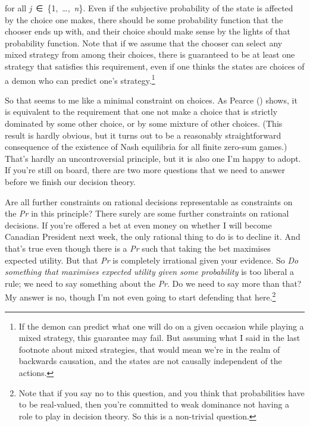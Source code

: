 \documentclass[
  11pt,
  letterpaper,
  DIV=11,
  numbers=noendperiod,
  twoside]{scrartcl}
\begin{document}
for all \emph{j}~∈~\{1,~\ldots,~\emph{n}\}. Even if the subjective
probability of the state is affected by the choice one makes, there
should be some probability function that the chooser ends up with, and
their choice should make sense by the lights of that probability
function. Note that if we assume that the chooser can select any mixed
strategy from among their choices, there is guaranteed to be at least
one strategy that satisfies this requirement, even if one thinks the
states are choices of a demon who can predict one's strategy.\footnote{If
  the demon can predict what one will do on a given occasion while
  playing a mixed strategy, this guarantee may fail. But assuming what I
  said in the last footnote about mixed strategies, that would mean
  we're in the realm of backwards causation, and the states are not
  causally independent of the actions.}

So that seems to me like a minimal constraint on choices. As Pearce
() shows, it is equivalent to the
requirement that one not make a choice that is strictly dominated by
some other choice, or by some mixture of other choices. (This result is
hardly obvious, but it turns out to be a reasonably straightforward
consequence of the existence of Nash equilibria for all finite zero-sum
games.) That's hardly an uncontroversial principle, but it is also one
I'm happy to adopt. If you're still on board, there are two more
questions that we need to answer before we finish our decision theory.

Are all further constraints on rational decisions representable as
constraints on the \emph{Pr} in this principle? There surely are some
further constraints on rational decisions. If you're offered a bet at
even money on whether I will become Canadian President next week, the
only rational thing to do is to decline it. And that's true even though
there is a \emph{Pr} such that taking the bet maximises expected
utility. But that \emph{Pr} is completely irrational given your
evidence. So \emph{Do something that maximises expected utility given
some probability} is too liberal a rule; we need to say something about
the \emph{Pr}. Do we need to say more than that? My answer is no, though
I'm not even going to start defending that here.\footnote{Note that if
  you say no to this question, and you think that probabilities have to
  be real-valued, then you're committed to weak dominance not having a
  role to play in decision theory. So this is a non-trivial question.}
\end{document}
